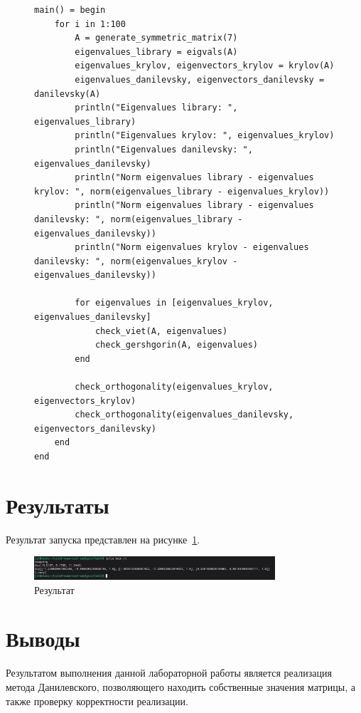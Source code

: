 \documentclass[a4paper, 14pt]{extarticle}
\begin{document}
\begin{figure}[!htb]
\begin{lstlisting}[language={},caption={Метод Данилевского (продолжение)},label={lst:code5}]
main() = begin
    for i in 1:100
        A = generate_symmetric_matrix(7)
        eigenvalues_library = eigvals(A)
        eigenvalues_krylov, eigenvectors_krylov = krylov(A)
        eigenvalues_danilevsky, eigenvectors_danilevsky = danilevsky(A)
        println("Eigenvalues library: ", eigenvalues_library)
        println("Eigenvalues krylov: ", eigenvalues_krylov)
        println("Eigenvalues danilevsky: ", eigenvalues_danilevsky)
        println("Norm eigenvalues library - eigenvalues krylov: ", norm(eigenvalues_library - eigenvalues_krylov))
        println("Norm eigenvalues library - eigenvalues danilevsky: ", norm(eigenvalues_library - eigenvalues_danilevsky))
        println("Norm eigenvalues krylov - eigenvalues danilevsky: ", norm(eigenvalues_krylov - eigenvalues_danilevsky))

        for eigenvalues in [eigenvalues_krylov, eigenvalues_danilevsky]
            check_viet(A, eigenvalues)
            check_gershgorin(A, eigenvalues)
        end

        check_orthogonality(eigenvalues_krylov, eigenvectors_krylov)
        check_orthogonality(eigenvalues_danilevsky, eigenvectors_danilevsky)
    end
end
\end{lstlisting}
\end{figure}

\clearpage
\section{Результаты}\label{Sect::res}

Результат запуска представлен на рисунке~\ref{fig:img3}.

\begin{figure}[!htb]
	\centering
	\includegraphics[width=0.8\textwidth]{img3}
\caption{Результат}
\label{fig:img3}
\end{figure}

\clearpage
\section{Выводы}\label{Sect::fin}

Результатом выполнения данной лабораторной работы является реализация метода
Данилевского, позволяющего находить собственные значения матрицы, а также
проверку корректности реализации.
\end{document}
